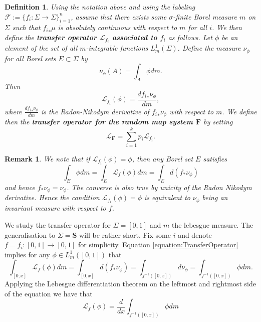 \documentclass[pdftex,11pt,a4paper,oneside]{article}
\theoremstyle{plain}
\newtheorem{remark}{Remark}[section]
\newtheorem{definition}{Definition}[section]
\begin{document}
\begin{definition}
Using the notation above and using the labeling $\mathcal{F}:=\{f_i:\Sigma\to\Sigma\}_{i=1}^n$, assume that there exists some $\sigma$-finite Borel measure $m$ on $\Sigma$ such that ${f_i}_*\mu$ is absolutely continuous with respect to $m$ for all $i$. We then define the \textbf{transfer operator $\mathcal{L}_{f_i}$ associated to $f_i$} as follows. Let $\phi$ be an element of the set of all $m$-integrable functions $L^1_m(\Sigma)$. Define the measure $\nu_\phi$ for all Borel sets $E\subset\Sigma$ by
\[\nu_\phi(A) =\int_A \phi dm.\]
Then 
\begin{equation}\label{equation:TransferOperator}
    \mathcal{L}_{f_i}(\phi) = \frac{d{f_i}_*\nu_\phi}{dm},
\end{equation}
where $\frac{d{f_i}_*\nu_\phi}{dm}$ is the Radon-Nikodym derivative of ${f_i}_*\nu_\phi$ with respect to $m$. We define then the \textbf{transfer operator for the random map system $\mathbf{F}$} by setting
\[\mathcal{L}_{\mathbf{F}} = \sum_{i=1}^k p_i \mathcal{L}_{f_i}.\]
\end{definition}
\begin{remark}
We note that if $\mathcal{L}_{f_i}(\phi) = \phi$, then any Borel set $E$ satisfies  
\begin{equation}\label{eq:RemarkOnTransferOperator}
    \int_E \phi dm=\int_E\mathcal{L}_f(\phi) dm =\int_E d(f_*\nu_\phi)
\end{equation}
and hence $f_*\nu_\phi =\nu_\phi$. The converse is also true by unicity of the Radon Nikodym derivative. Hence the condition $\mathcal{L}_{f_i}(\phi) = \phi$ is equivalent to $\nu_\phi$ being an invariant measure with respect to $f$.
\end{remark}
We study the transfer operator for $\Sigma = [0,1]$ and $m$ the lebesgue measure. The generalisation to $\Sigma = \mathbf{S}$ will be rather short. Fix some $i$ and denote $f=f_i:[0,1]\to [0,1]$ for simplicity. Equation \eqref{equation:TransferOperator} implies for any $\phi \in L^1_m([0,1])$ that 
\begin{equation}\label{equation:UnpackingCurlyLambda}
    \int_{[0,x]}\mathcal{L}_f(\phi) dm = \int_{[0,x]}d(f_*\nu_\phi)   = \int_{f^{-1}([0,x])}d\nu_\phi = \int_{f^{-1}([0,x])} \phi dm .
\end{equation}
Applying the Lebesgue differentiation theorem on the leftmost and rightmost side of the equation we have that
\begin{equation}\label{equation:explicitFormulaForTransferOperator}
    \mathcal{L}_f(\phi) = \frac{d}{d x}\int_{f^{-1}([0,x])} \phi dm 
\end{equation}
\end{document}
